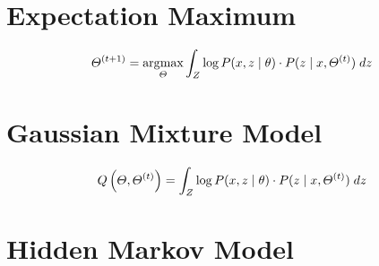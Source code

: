 


\section{Expectation Maximum} %
\label{sec:Expectation Maximum}

\[
	\Theta^{\left(t+1\right)} = \argmax_{\Theta} \int_Z \log P \giventhat{x,z}{\theta} \cdot P \giventhat{z}{x, \Theta^{\left(t\right)}} \; dz
\]


\section{Gaussian Mixture Model} %
\label{sec:Gaussian Mixture Model}

\[
	Q\left(\Theta, \Theta^{\left(t\right)}\right) = \int_Z \log P \giventhat{x,z}{\theta} \cdot P \giventhat{z}{x, \Theta^{\left(t\right)}} \; dz
\]


\section{Hidden Markov Model} %
\label{sec:Hidden Markov Model}


